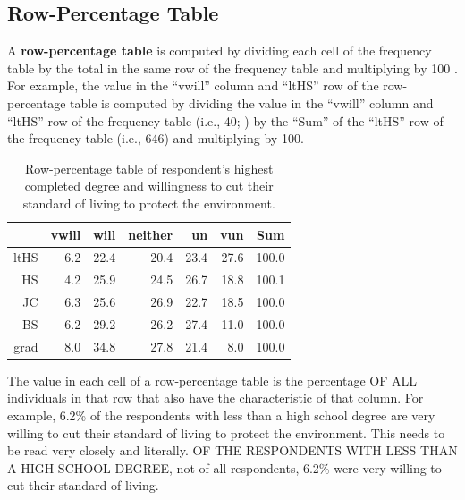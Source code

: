 \documentclass[10pt,openany]{book}\usepackage[]{graphicx}\usepackage[]{color}
\begin{document}
\subsection{Row-Percentage Table}
\vspace{-12pt}
A \textbf{row-percentage table} is computed by dividing each cell of the frequency table by the total in the same row of the frequency table and multiplying by 100 .  For example, the value in the ``vwill'' column and ``ltHS'' row of the row-percentage table is computed by dividing the value in the ``vwill'' column and ``ltHS'' row of the frequency table (i.e., 40; ) by the ``Sum'' of the ``ltHS'' row of the frequency table (i.e., 646) and multiplying by 100.

\begin{table}[ht]
\centering
\caption{Row-percentage table of respondent's highest completed degree and willingness to cut their standard of living to protect the environment.} 
\label{tab:EnvRowP}
\begin{tabular}{rrrrrrr}
  \hline
 & vwill & will & neither & un & vun & Sum \\ 
  \hline
ltHS & 6.2 & 22.4 & 20.4 & 23.4 & 27.6 & 100.0 \\ 
  HS & 4.2 & 25.9 & 24.5 & 26.7 & 18.8 & 100.1 \\ 
  JC & 6.3 & 25.6 & 26.9 & 22.7 & 18.5 & 100.0 \\ 
  BS & 6.2 & 29.2 & 26.2 & 27.4 & 11.0 & 100.0 \\ 
  grad & 8.0 & 34.8 & 27.8 & 21.4 & 8.0 & 100.0 \\ 
   \hline
\end{tabular}
\end{table}


The value in each cell of a row-percentage table is the percentage OF ALL individuals in that row that also have the characteristic of that column.  For example, 6.2\% of the respondents with less than a high school degree are very willing to cut their standard of living to protect the environment.  This needs to be read very closely and literally.  OF THE RESPONDENTS WITH LESS THAN A HIGH SCHOOL DEGREE, not of all respondents, 6.2\% were very willing to cut their standard of living.

\end{document}
